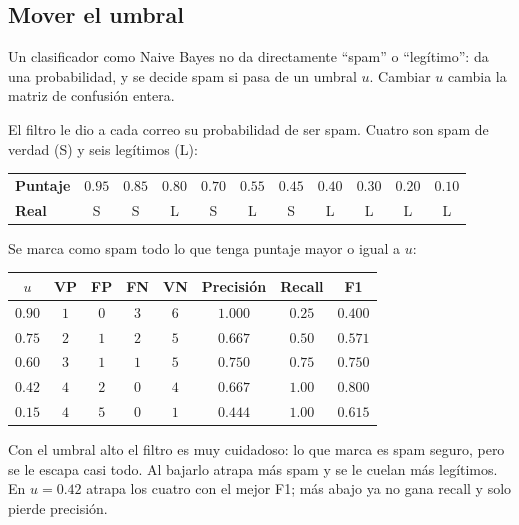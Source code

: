 \documentclass[11pt,letterpaper]{article}
\begin{document}

\subsection*{Mover el umbral}

Un clasificador como Naive Bayes no da directamente ``spam'' o
``legítimo'': da una probabilidad, y se decide spam si pasa de un
umbral $u$. Cambiar $u$ cambia la matriz de confusión entera.

\begin{ejemplo}
    El filtro le dio a cada correo su probabilidad de ser spam. Cuatro
    son spam de verdad (S) y seis legítimos (L):
    \begin{center}
    \small
    \begin{tabular}{lcccccccccc}
        \toprule
        \textbf{Puntaje} & $0.95$ & $0.85$ & $0.80$ & $0.70$ & $0.55$
            & $0.45$ & $0.40$ & $0.30$ & $0.20$ & $0.10$ \\
        \textbf{Real} & S & S & L & S & L & S & L & L & L & L \\
        \bottomrule
    \end{tabular}
    \end{center}
    Se marca como spam todo lo que tenga puntaje mayor o igual a $u$:
    \begin{center}
    \small
    \begin{tabular}{cccccccc}
        \toprule
        $u$ & VP & FP & FN & VN & \textbf{Precisión} & \textbf{Recall}
            & \textbf{F1} \\
        \midrule
        $0.90$ & $1$ & $0$ & $3$ & $6$ & $1.000$ & $0.25$ & $0.400$ \\
        $0.75$ & $2$ & $1$ & $2$ & $5$ & $0.667$ & $0.50$ & $0.571$ \\
        $0.60$ & $3$ & $1$ & $1$ & $5$ & $0.750$ & $0.75$ & $0.750$ \\
        $0.42$ & $4$ & $2$ & $0$ & $4$ & $0.667$ & $1.00$ & $0.800$ \\
        $0.15$ & $4$ & $5$ & $0$ & $1$ & $0.444$ & $1.00$ & $0.615$ \\
        \bottomrule
    \end{tabular}
    \end{center}
    Con el umbral alto el filtro es muy cuidadoso: lo que marca es
    spam seguro, pero se le escapa casi todo. Al bajarlo atrapa más
    spam y se le cuelan más legítimos. En $u = 0.42$ atrapa los cuatro
    con el mejor F1; más abajo ya no gana recall y solo pierde
    precisión.
\end{ejemplo}
\end{document}

